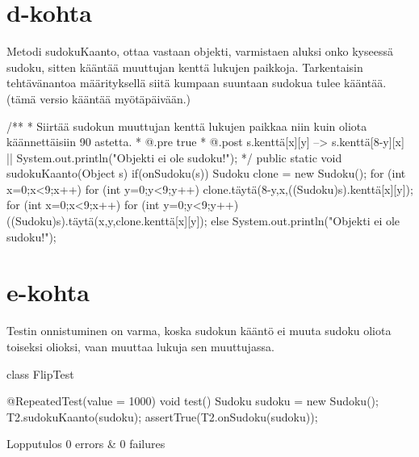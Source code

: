 \section{d-kohta}
\label{d-kohta}

Metodi sudokuKaanto, ottaa vastaan objekti, varmistaen aluksi onko kyseessä sudoku, sitten kääntää muuttujan kenttä
lukujen paikkoja. Tarkentaisin tehtävänantoa määrityksellä siitä kumpaan suuntaan sudokua tulee kääntää.
(tämä versio kääntää myötäpäivään.)
\begin{javacode}
	/**
	 * Siirtää sudokun muuttujan kenttä lukujen paikkaa niin kuin oliota käännettäisiin 90 astetta.
	 * @.pre true
	 * @.post s.kenttä[x][y] --> s.kenttä[8-y][x] || System.out.println("Objekti ei ole sudoku!");
	 */
	public static void sudokuKaanto(Object s){
		if(onSudoku(s)) {
			Sudoku clone = new Sudoku();
			for (int x=0;x<9;x++) {
				for (int y=0;y<9;y++) {
					clone.täytä(8-y,x,((Sudoku)s).kenttä[x][y]);
				}
			}
			for (int x=0;x<9;x++) {
				for (int y=0;y<9;y++) {
					((Sudoku)s).täytä(x,y,clone.kenttä[x][y]);
				}
			}
		}else {
			System.out.println("Objekti ei ole sudoku!");
		}
	}
\end{javacode}

\section{e-kohta}
\label{e-kohta}

Testin onnistuminen on varma, koska sudokun kääntö ei muuta sudoku oliota toiseksi olioksi, vaan muuttaa lukuja sen
muuttujassa.

\begin{javacode}
class FlipTest {

	@RepeatedTest(value = 1000)
	void test() {
		Sudoku sudoku = new Sudoku();
		T2.sudokuKaanto(sudoku);
		assertTrue(T2.onSudoku(sudoku));
	}

}
\end{javacode}
Lopputulos 0 errors & 0 failures